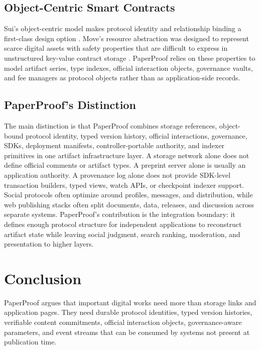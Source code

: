 \documentclass[journal]{IEEEtran}
\begin{document}
\subsection{Object-Centric Smart Contracts}

Sui's object-centric model makes protocol identity and relationship binding a first-class design option \cite{mysten2022sui,welc2023sui_move,sui_docs}. Move's resource abstraction was designed to represent scarce digital assets with safety properties that are difficult to express in unstructured key-value contract storage \cite{blackshear2020move}. PaperProof relies on these properties to model artifact series, type indexes, official interaction objects, governance vaults, and fee managers as protocol objects rather than as application-side records.

\subsection{PaperProof's Distinction}

The main distinction is that PaperProof combines storage references, object-bound protocol identity, typed version history, official interactions, governance, SDKs, deployment manifests, controller-portable authority, and indexer primitives in one artifact infrastructure layer. A storage network alone does not define official comments or artifact types. A preprint server alone is usually an application authority. A provenance log alone does not provide SDK-level transaction builders, typed views, watch APIs, or checkpoint indexer support. Social protocols often optimize around profiles, messages, and distribution, while web publishing stacks often split documents, data, releases, and discussion across separate systems. PaperProof's contribution is the integration boundary: it defines enough protocol structure for independent applications to reconstruct artifact state while leaving social judgment, search ranking, moderation, and presentation to higher layers.

\section{Conclusion}

PaperProof argues that important digital works need more than storage links and application pages. They need durable protocol identities, typed version histories, verifiable content commitments, official interaction objects, governance-aware parameters, and event streams that can be consumed by systems not present at publication time.
\end{document}
